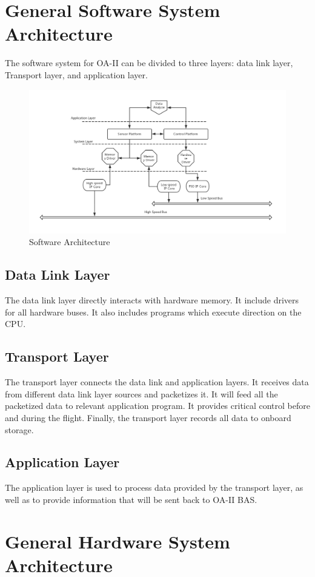 \documentclass[12pt,article]{memoir}
\begin{document}
\chapter{General Software System Architecture}
The software system for OA-II can be divided to three layers: data link layer, Transport layer, and application layer.
\begin{figure}[htp]
\includegraphics[width=\textwidth]{softarch.png}
\caption{Software Architecture}	
\end{figure}
\section{Data Link Layer}
The data link layer directly interacts with hardware memory. It include drivers for all hardware buses. It also includes programs which execute direction on the CPU.
\section{Transport Layer}
The transport layer connects the data link and application layers. It receives data from different data link layer sources and packetizes it. It will feed all the packetized data to relevant application program. It provides critical control before and during the flight. Finally, the transport layer records all data to onboard storage.
\section{Application Layer}
The application layer is used to process data provided by the transport layer, as well as to provide information that will be sent back to OA-II BAS.

\newpage

\chapter{General Hardware System Architecture}
\end{document}
